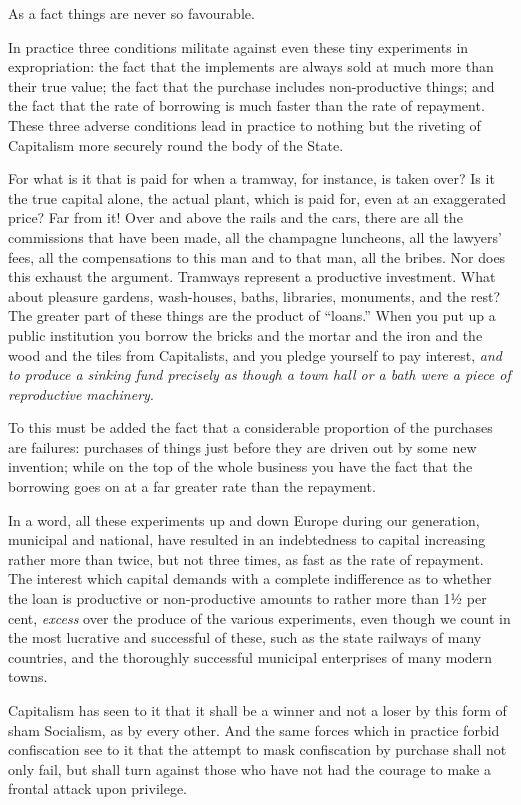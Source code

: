 \documentclass{book}
\begin{document}
As a fact things are never so favourable.

In practice three conditions militate against even these tiny experiments in expropriation: the fact that the implements are always sold at much more than their true value; the fact that the purchase includes non-productive things; and the fact that the rate of borrowing is much faster than the rate of repayment. These three adverse conditions lead in practice to nothing but the riveting of Capitalism more securely round the body of the State.

For what is it that is paid for when a tramway, for instance, is taken over? Is it the true capital alone, the actual plant, which is paid for, even at an exaggerated price? Far from it! Over and above the rails and the cars, there are all the commissions that have been made, all the champagne luncheons, all the lawyers’ fees, all the compensations to this man and to that man, all the bribes. Nor does this exhaust the argument. Tramways represent a productive investment. What about pleasure gardens, wash-houses, baths, libraries, monuments, and the rest? The greater part of these things are the product of “loans.” When you put up a public institution you borrow the bricks and the mortar and the iron and the wood and the tiles from Capitalists, and you pledge yourself to pay interest, \emph{and to produce a sinking fund precisely as though a town hall or a bath were a piece of reproductive machinery}.

To this must be added the fact that a considerable proportion of the purchases are failures: purchases of things just before they are driven out by some new invention; while on the top of the whole business you have the fact that the borrowing goes on at a far greater rate than the repayment.

In a word, all these experiments up and down Europe during our generation, municipal and national, have resulted in an indebtedness to capital increasing rather more than twice, but not three times, as fast as the rate of repayment. The interest which capital demands with a complete indifference as to whether the loan is productive or non-productive amounts to rather more than 1½ per cent, \emph{excess} over the produce of the various experiments, even though we count in the most lucrative and successful of these, such as the state railways of many countries, and the thoroughly successful municipal enterprises of many modern towns.

Capitalism has seen to it that it shall be a winner and not a loser by this form of sham Socialism, as by every other. And the same forces which in practice forbid confiscation see to it that the attempt to mask confiscation by purchase shall not only fail, but shall turn against those who have not had the courage to make a frontal attack upon privilege.
\end{document}
